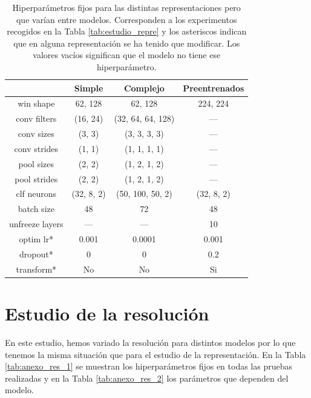 \documentclass[a4paper,12pt,oneside,titlepage]{book}
\begin{document}
\begin{appendices}
  \begin{table}[h!]
    \centering
    \begin{tabular}{|c|c|c|c|}
    \hline
                 & Simple     & Complejo          & Preentrenados \\ \hline\hline
    win shape    & 62, 128    & 62, 128           & 224, 224      \\ \hline
    conv filters & (16, 24)   & (32, 64, 64, 128) & ---           \\ \hline
    conv sizes   & (3, 3)     & (3, 3, 3, 3)      & ---           \\ \hline
    conv strides & (1, 1)     & (1, 1, 1, 1)      & ---           \\ \hline
    pool sizes   & (2, 2)     & (1, 2, 1, 2)      & ---           \\ \hline
    pool strides & (2, 2)     & (1, 2, 1, 2)      & ---           \\ \hline
    clf neurons  & (32, 8, 2) & (50, 100, 50, 2)  & (32, 8, 2)    \\ \hline
    batch size   & 48         & 72                & 48            \\ \hline
    unfreeze layers   & ---   & ---               & 10            \\ \hline
    optim lr*    & 0.001      & 0.0001            & 0.001         \\ \hline
    dropout*     & 0          & 0                 & 0.2           \\ \hline
    transform*   & No         & No                & Si            \\ \hline
    \end{tabular}
    \caption{Hiperparámetros fijos para las distintas representaciones pero que varían entre modelos. Corresponden a los experimentos recogidos en la Tabla \ref{tab:estudio_repre} y los asteriscos indican que en alguna representación se ha tenido que modificar. Los valores vacíos significan que el modelo no tiene ese hiperparámetro.}
    \label{tab:anexo_rep_2}
  \end{table}
  
  \section{Estudio de la resolución}
  \label{an:3}

  En este estudio, hemos variado la resolución para distintos modelos por lo que tenemos la misma situación que para el estudio de la representación. En la Tabla \ref{tab:anexo_res_1} se muestran los hiperparámetros fijos en todas las pruebas realizadas y en la Tabla \ref{tab:anexo_res_2} los parámetros que dependen del modelo.
 

\end{appendices}
\end{document}
